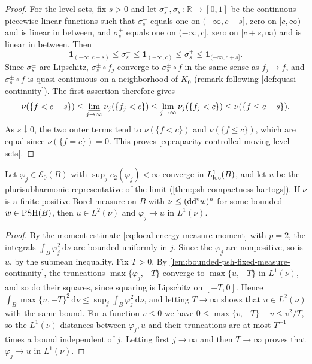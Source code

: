 \begin{proof}
For the level sets, fix $s>0$ and let $\sigma^-_s,\sigma^+_s\colon\mathbb R\to[0,1]$ be the continuous piecewise linear functions such that $\sigma^-_s$ equals one on $(-\infty,c-s]$, zero on $[c,\infty)$ and is linear in between, and $\sigma^+_s$ equals one on $(-\infty,c]$, zero on $[c+s,\infty)$ and is linear in between. Then
\[
 \mathbf1_{(-\infty,c-s)}\leq\sigma^-_s
 \leq\mathbf1_{(-\infty,c)}\leq\sigma^+_s
 \leq\mathbf1_{(-\infty,c+s]}.
\]
Since $\sigma^\pm_s$ are Lipschitz, $\sigma^\pm_s\circ f_j$ converge to $\sigma^\pm_s\circ f$ in the same sense as $f_j\to f$, and $\sigma^\pm_s\circ f$ is quasi-continuous on a neighborhood of $K_0$ (remark following \cref{def:quasi-continuity}). The first assertion therefore gives
\[
 \nu(\{f<c-s\})\leq\varliminf_{j\to\infty}\nu_j(\{f_j<c\})
 \leq\varlimsup_{j\to\infty}\nu_j(\{f_j<c\})\leq\nu(\{f\leq c+s\}).
\]
As $s\downarrow0$, the two outer terms tend to $\nu(\{f<c\})$ and $\nu(\{f\leq c\})$, which are equal since $\nu(\{f=c\})=0$. This proves \eqref{eq:capacity-controlled-moving-level-sets}.
\end{proof}

\begin{corollary}\label{cor:energy-controlled-fixed-measure-limit}
Let $\varphi_j\in\mathcal E_0(B)$ with $\sup_je_2(\varphi_j)<\infty$ converge in $L^1_{\mathrm{loc}}(B)$, and let $u$ be the plurisubharmonic representative of the limit (\cref{thm:psh-compactness-hartogs}). If $\nu$ is a finite positive Borel measure on $B$ with $\nu\leq(\mathrm{dd}^{\mathrm{c}} w)^n$ for some bounded $w\in\mathrm{PSH}(B)$, then $u\in L^2(\nu)$ and $\varphi_j\to u$ in $L^1(\nu)$.
\end{corollary}
\begin{proof}
By the moment estimate \eqref{eq:local-energy-measure-moment} with $p=2$, the integrals $\int_B\varphi_j^2\,\mathrm d\nu$ are bounded uniformly in $j$. Since the $\varphi_j$ are nonpositive, so is $u$, by the submean inequality. Fix $T>0$. By \cref{lem:bounded-psh-fixed-measure-continuity}, the truncations $\max\{\varphi_j,-T\}$ converge to $\max\{u,-T\}$ in $L^1(\nu)$, and so do their squares, since squaring is Lipschitz on $[-T,0]$. Hence $\int_B\max\{u,-T\}^2\,\mathrm d\nu\leq\sup_j\int_B\varphi_j^2\,\mathrm d\nu$, and letting $T\to\infty$ shows that $u\in L^2(\nu)$ with the same bound. For a function $v\leq0$ we have $0\leq\max\{v,-T\}-v\leq v^2/T$, so the $L^1(\nu)$ distances between $\varphi_j,u$ and their truncations are at most $T^{-1}$ times a bound independent of $j$. Letting first $j\to\infty$ and then $T\to\infty$ proves that $\varphi_j\to u$ in $L^1(\nu)$.
\end{proof}


